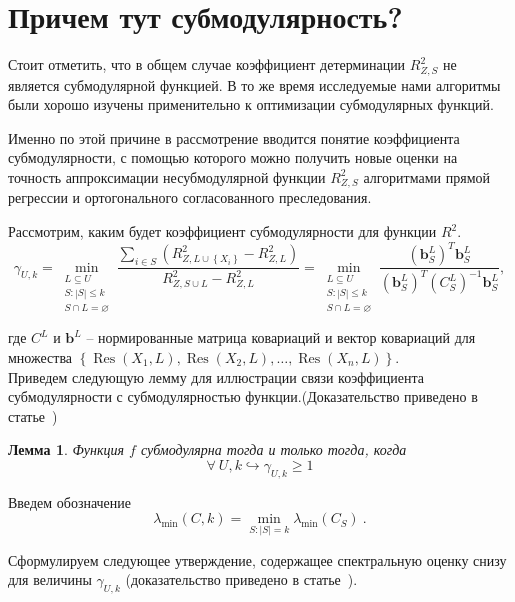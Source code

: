 \documentclass[preprint,12pt]{elsarticle}
\begin{document}
\section{Причем тут субмодулярность?}

Стоит отметить, что в общем случае коэффициент детерминации $R^2_{Z, S}$ не является субмодулярной функцией. В то же время исследуемые нами алгоритмы были хорошо изучены применительно к оптимизации субмодулярных функций. 

Именно по этой причине в рассмотрение вводится понятие коэффициента субмодулярности, с помощью которого можно получить новые оценки на точность аппроксимации несубмодулярной функции $R^2_{Z, S}$ алгоритмами прямой регрессии и ортогонального согласованного преследования.

Рассмотрим, каким будет коэффициент субмодулярности для функции $R^2$.
\[\gamma_{U, k}=\min_{\substack{L \subseteq U\\ S:|S| \leq k \\ S \cap L=\varnothing}} \frac{\sum_{i \in S}\left(R_{Z, L \cup\left\{X_{i}\right\}}^{2}-R_{Z, L}^{2}\right)}{R_{Z, S \cup L}^{2}-R_{Z, L}^{2}}=\min_{\substack{L \subseteq U\\ S:|S| \leq k \\ S \cap L=\varnothing}} \frac{\left(\mathbf{b}_{S}^{L}\right)^{T} \mathbf{b}_{S}^{L}}{\left(\mathbf{b}_{S}^{L}\right)^{T}\left(C_{S}^{L}\right)^{-1} \mathbf{b}_{S}^{L}},\]

где $C^L$ и $\mathbf{b}^L$ -- нормированные матрица ковариаций и вектор ковариаций для множества $\left\{\operatorname{Res}\left(X_{1}, L\right), \operatorname{Res}\left(X_{2}, L\right), \ldots, \operatorname{Res}\left(X_{n}, L\right)\right\}$.\\

Приведем следующую лемму для иллюстрации связи коэффициента субмодулярности с субмодулярностью функции.(Доказательство приведено в статье~\cite{das2011submodular})
\newtheorem{lemma}{Лемма}
\begin{lemma}
Функция $f$ субмодулярна тогда и только тогда, когда
\[\forall~U, k \hookrightarrow \gamma_{U, k} \geqslant 1\]
\end{lemma}

Введем обозначение 
\[\lambda_{\min }(C, k)=\min _{S:|S|=k} \lambda_{\min }\left(C_{S}\right)~.\]

Сформулируем следующее утверждение, содержащее спектральную оценку снизу для величины $\gamma_{U, k}$ (доказательство приведено в статье~\cite{das2011submodular}).
\end{document}
